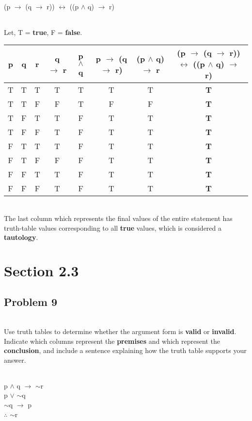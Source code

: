 \documentclass{article}
\begin{document}
\\ (p $\rightarrow$ (q $\rightarrow$ r)) $\leftrightarrow$ ((p $\wedge$ q) $\rightarrow$ r)

\\ Let, T = \textbf{true}, F = \textbf{false}.
\begin{center}
	\begin{tabular}{ |c|c|c|c|c|c|c|c| } 
		\hline
		p & q & r & q $\rightarrow$ r & p $\wedge$ q & p $\rightarrow$ (q $\rightarrow$ r) & (p $\wedge$ q) $\rightarrow$ r & (p $\rightarrow$ (q $\rightarrow$ r)) $\leftrightarrow$ ((p $\wedge$ q) $\rightarrow$ r) \\ 
		\hline
		T & T & T & T & T & T & T & \textbf{T} \\ 
		T & T & F & F & T & F & F & \textbf{T} \\ 
		T & F & T & T & F & T & T & \textbf{T} \\ 
		T & F & F & T & F & T & T & \textbf{T} \\
		F & T & T & T & F & T & T & \textbf{T} \\ 
		F & T & F & F & F & T & T & \textbf{T} \\
		F & F & T & T & F & T & T & \textbf{T} \\ 
		F & F & F & T & F & T & T & \textbf{T} \\
		\hline
	\end{tabular}
\end{center}

\\ The last column which represents the final values of the entire statement has truth-table values corresponding to all \textbf{true} values, which is considered a \textbf{tautology}.

\section*{Section 2.3}
\subsection*{Problem 9}

\\ Use truth tables to determine whether the argument form is \textbf{valid} or \textbf{invalid}. Indicate which columns represent the \textbf{premises} and which represent the \textbf{conclusion}, and include a sentence explaining how the truth table supports your answer. 

\\ p $\wedge$ q $\rightarrow$ $\sim$r 
\\ p $\vee$ $\sim$q
\\ $\sim$q $\rightarrow$ p
\\ $\therefore$ $\sim$r
\end{document}
